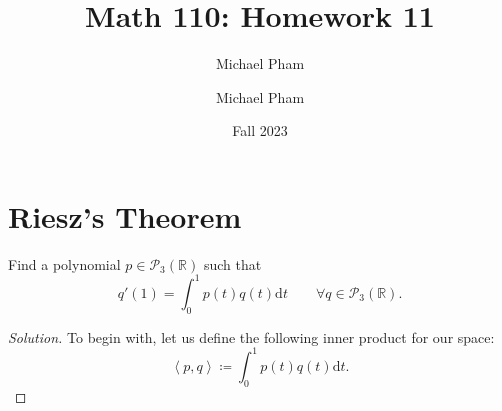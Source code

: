 \documentclass{article}
\title{#1}
\author{Michael Pham}
\date{#2}
\newenvironment{solution}{\begin{proof}[Solution]}{\end{proof}}
\newcommand{\RR}{\mathbb{R}}
\newcommand{\innerproduct}[2]{\left\langle{#1}, {#2}\right\rangle}
\newcommand{\mytitle}[2]{%
	\title{#1}
	\author{Michael Pham}
	\date{#2}
	\maketitle
	\newpage
	\tableofcontents
	\newpage
}
\begin{document}
	\mytitle{Math 110: Homework 11}{Fall 2023}
	\section{Riesz's Theorem}
	\begin{hw}
		Find a polynomial $p \in \mathscr{P}_{3}(\RR)$ such that
		\begin{equation*}
			q'(1) = \int_{0}^{1} p(t) q(t) \mathrm{d}t \qquad \forall q \in \mathscr{P}_{3}(\RR).
		\end{equation*}
	\end{hw}
	\begin{solution}
		To begin with, let us define the following inner product for our space:
		\begin{equation*}
			\innerproduct{p}{q} \coloneq \int_{0}^{1} p(t) q(t) \mathrm dt.
		\end{equation*}
		

\end{solution}
\end{document}
